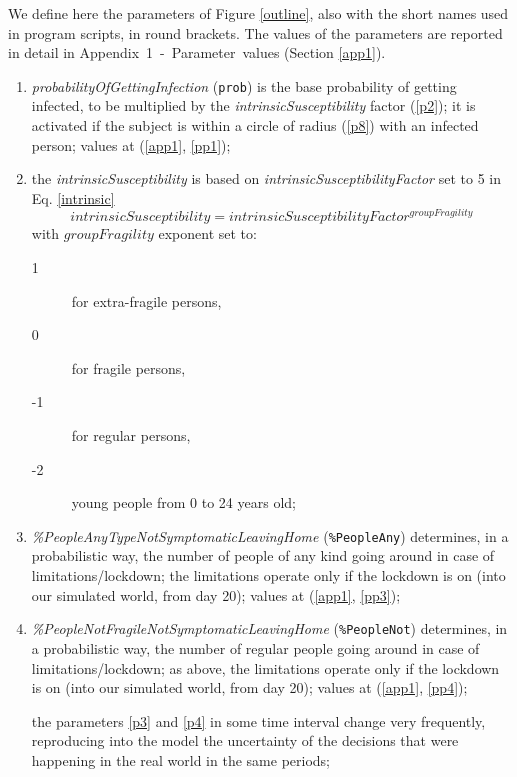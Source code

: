 \documentclass[graybox]{svmult}
\begin{document}
We define here the parameters of Figure \ref{outline}, also with the short names used in program scripts, in round brackets. The values of the parameters are reported in detail in Appendix~1~-~Parameter~values (Section \ref{app1}).

\begin{enumerate}[label=\roman*]

\item \label{p1} \emph{probabilityOfGettingInfection} (\verb|prob|) is the base probability of getting infected, to be multiplied by the \emph{intrinsicSusceptibility} factor (\ref{p2}); it is activated if the subject is within a circle of radius  (\ref{p8}) with an infected person; values at (\ref{app1}, \ref{pp1});

\item \label{p2} the \emph{intrinsicSusceptibility} is based on \emph{intrinsicSusceptibilityFactor} set to 5 in Eq. \ref{intrinsic}
\begin{equation}
intrinsicSusceptibility = intrinsicSusceptibilityFactor^{groupFragility}
\label{intrinsic}
\end{equation}
with $groupFragility$ exponent set to:

\begin{description}
\item [1] for extra-fragile persons,
\item [0] for fragile persons,
\item [-1] for regular persons,
\item [-2] young people from 0 to 24 years old;
\end{description}

\item \label{p3} \emph{\%PeopleAnyTypeNotSymptomaticLeavingHome} (\verb|%PeopleAny|)
determines, in a probabilistic way, the number of people of any kind going around in case of limitations/lockdown; the limitations operate only if the lockdown is on (into our simulated world, from day 20); values at (\ref{app1}, \ref{pp3}); 

\item \label{p4} \emph{\%PeopleNotFragileNotSymptomaticLeavingHome} (\verb|%PeopleNot|)
determines, in a probabilistic way, the number of regular people going around in case of limitations/lockdown;
as above, the limitations operate only if the lockdown is on (into our simulated world, from day 20); values at (\ref{app1}, \ref{pp4});

the parameters \ref{p3} and \ref{p4} in some time interval change very frequently, reproducing into the model the uncertainty of the decisions that were happening  in the real world in the same periods; 


\end{enumerate}
\end{document}
